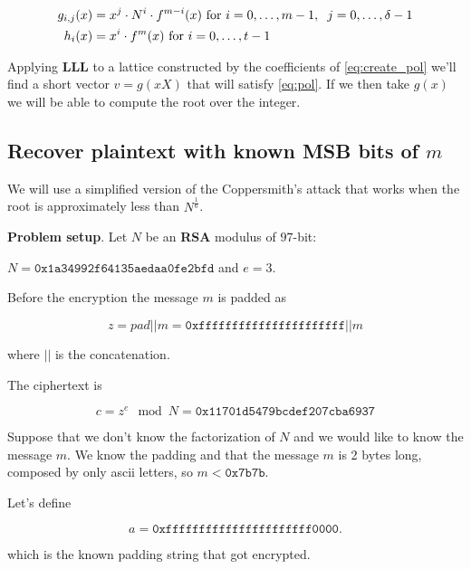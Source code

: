 \documentclass[a4paper,12pt]{report}
\begin{document}
\begin{center}
    \begin{eqnarray}
        g_{i,j}(x) &= x^j \cdot N^i \cdot f^{m-i}(x) \text{ for } i = 0,\hdots,m-1,\hspace{2mm} j=0,\hdots,\delta-1 \label{eq:create_pol} \\
        h_i(x) &= x^i \cdot f^m(x) \text{ for } i = 0,\hdots,t-1 
    \end{eqnarray}
\end{center}

Applying \textbf{LLL} to a lattice constructed by the coefficients of \ref{eq:create_pol} we'll find a short vector $v = g(xX)$ that will
satisfy \ref{eq:pol}. If we then take $g(x)$ we will be able to compute the root over the integer.

\subsection{Recover plaintext with known MSB bits of $m$}

We will use a simplified version of the Coppersmith's attack that works when the root is approximately less than $N^{\frac{1}{6}}$.

\textbf{Problem setup}. Let $N$ be an \textbf{RSA} modulus of $97$-bit:

\begin{center}
    $N=\texttt{0x1a34992f64135aedaa0fe2bfd}$ and $e = 3$.
\end{center}

Before the encryption the message $m$ is padded as

\[
    z = pad || m = \texttt{0xffffffffffffffffffffff} || m
\]

where $||$ is the concatenation.

The ciphertext is

\[
    c = z^e \mod N = \texttt{0x11701d5479bcdef207cba6937}
\]

Suppose that we don't know the factorization of $N$ and we would like to know the message $m$.
We know the padding and that the message $m$ is 2 bytes long, composed by only ascii letters, so $m < \texttt{0x7b7b}$.

\vspace*{10px}

Let's define

\[
    a = \texttt{0xffffffffffffffffffffff0000}
.\] 

which is the known padding string that got encrypted.
\end{document}
